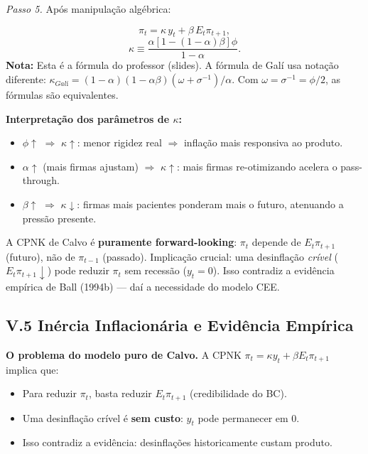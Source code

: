 \documentclass[12pt, a4paper]{article}
\begin{document}
\textit{Passo 5.} Após manipulação algébrica:

\begin{formulabox}[title={Curva de Phillips NK de Calvo (eq.\ 25) --- Notação das Slides}]
\[
\boxed{\pi_t = \kappa\, y_t + \beta\, E_t\pi_{t+1},}
\]
\[
\boxed{\kappa \equiv \frac{\alpha[1-(1-\alpha)\beta]\phi}{1-\alpha}.}
\]
\textbf{Nota:} Esta é a fórmula do professor (slides). A fórmula de Galí usa notação diferente: $\kappa_{Galí} = (1-\alpha)(1-\alpha\beta)(\omega+\sigma^{-1})/\alpha$. Com $\omega = \sigma^{-1} = \phi/2$, as fórmulas são equivalentes.
\end{formulabox}

\textbf{Interpretação dos parâmetros de $\kappa$:}
\begin{itemize}[leftmargin=1.5em, itemsep=2pt]
  \item $\phi\uparrow$ $\Rightarrow$ $\kappa\uparrow$: menor rigidez real $\Rightarrow$ inflação mais responsiva ao produto.
  \item $\alpha\uparrow$ (mais firmas ajustam) $\Rightarrow$ $\kappa\uparrow$: mais firmas re-otimizando acelera o pass-through.
  \item $\beta\uparrow$ $\Rightarrow$ $\kappa\downarrow$: firmas mais pacientes ponderam mais o futuro, atenuando a pressão presente.
\end{itemize}

\begin{provabox}[title={CPNK Calvo: Forward-looking --- Para a Prova}]
A CPNK de Calvo é \textbf{puramente forward-looking}: $\pi_t$ depende de $E_t\pi_{t+1}$ (futuro), não de $\pi_{t-1}$ (passado). Implicação crucial: uma desinflação \emph{crível} ($E_t\pi_{t+1}\downarrow$) pode reduzir $\pi_t$ sem recessão ($y_t = 0$). Isso contradiz a evidência empírica de Ball (1994b) --- daí a necessidade do modelo CEE.
\end{provabox}

\subsection*{V.5 Inércia Inflacionária e Evidência Empírica}

\textbf{O problema do modelo puro de Calvo.} A CPNK $\pi_t = \kappa y_t + \beta E_t\pi_{t+1}$ implica que:
\begin{itemize}[leftmargin=1.5em, itemsep=2pt]
  \item Para reduzir $\pi_t$, basta reduzir $E_t\pi_{t+1}$ (credibilidade do BC).
  \item Uma desinflação crível é \textbf{sem custo}: $y_t$ pode permanecer em 0.
  \item Isso contradiz a evidência: desinflações historicamente custam produto.
\end{itemize}
\end{document}
